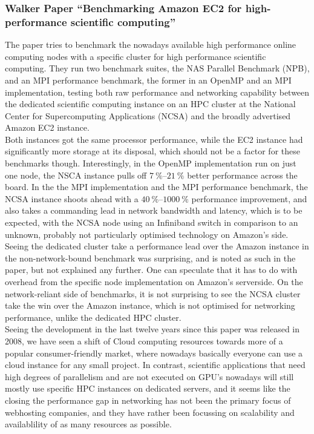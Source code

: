 \documentclass[]{scrartcl}
\begin{document}
\subsubsection{Walker Paper ``Benchmarking Amazon EC2 for high-performance scientific computing''}
The paper tries to benchmark the nowadays available high performance online computing nodes with a specific cluster for high performance scientific computing. They run two benchmark suites, the NAS Parallel Benchmark (NPB), and an MPI performance benchmark, the former in an OpenMP and an MPI implementation, testing both raw performance and networking capability between the dedicated scientific computing instance on an HPC cluster at the National Center for Supercomputing Applications (NCSA) and the broadly advertised Amazon EC2 instance.
\\
Both instances got the same processor performance, while the EC2 instance had significantly more storage at its disposal, which should not be a factor for these benchmarks though. Interestingly, in the OpenMP implementation run on just one node, the NSCA instance pulls off $ \SIrange{7}{21}{\percent} $ better performance across the board. In the the MPI implementation and the MPI performance benchmark, the NCSA instance shoots ahead with a $ \SIrange{40}{1000}{\percent} $ performance improvement, and also takes a commanding lead in network bandwidth and latency, which is to be expected, with the NCSA node using an Infiniband switch in comparison to an unknown, probably not particularly optimised technology on Amazon's side.
\\
Seeing the dedicated cluster take a performance lead over the Amazon instance in the non-network-bound benchmark was surprising, and is noted as such in the paper, but not explained any further. One can speculate that it has to do with overhead from the specific node implementation on Amazon's serverside. On the network-reliant side of benchmarks, it is not surprising to see the NCSA cluster take the win over the Amazon instance, which is not optimised for networking performance, unlike the dedicated HPC cluster.
\\
Seeing the development in the last twelve years since this paper was released in 2008, we have seen a shift of Cloud computing resources towards more of a popular consumer-friendly market, where nowadays basically everyone can use a cloud instance for any small project. In contrast, scientific applications that need high degrees of parallelism and are not executed on GPU's nowadays will still mostly use specific HPC instances on dedicated servers, and it seems like the closing the performance gap in networking has not been the primary focus of webhosting companies, and they have rather been focussing on scalability and availablility of as many resources as possible.
\end{document}
